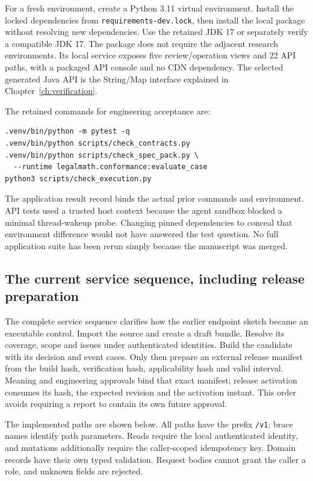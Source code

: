 \documentclass[12pt,a4paper,oneside,openany]{book}
\begin{document}
For a fresh environment, create a Python 3.11 virtual environment. Install the
locked dependencies from \texttt{requirements-dev.lock}, then install the local
package without resolving new dependencies. Use the retained JDK 17 or separately verify a compatible
JDK 17. The package does not require the adjacent research environments. Its
local service exposes five review/operation views and 22 API paths, with a
packaged API console and no CDN dependency. The selected generated Java API is
the String/Map interface explained in Chapter~\ref{ch:verification}.

The retained commands for engineering acceptance are:
\begin{lstlisting}
.venv/bin/python -m pytest -q
.venv/bin/python scripts/check_contracts.py
.venv/bin/python scripts/check_spec_pack.py \
  --runtime legalmath.conformance:evaluate_case
python3 scripts/check_execution.py
\end{lstlisting}
The application result record binds the actual prior commands and environment.
API tests used a trusted host context because the agent sandbox blocked a
minimal thread-wakeup probe. Changing pinned dependencies to conceal that
environment difference would not have answered the test question. No full
application suite has been rerun simply because the manuscript was merged.

\subsection{The current service sequence, including release preparation}

The complete service sequence clarifies how the earlier endpoint sketch became
an executable control. Import the source and create a draft bundle. Resolve
its coverage, scope and issues under authenticated identities. Build the
candidate with its decision and event cases. Only then prepare an external
release manifest from the build hash, verification hash, applicability hash
and valid interval. Meaning and engineering approvals bind that exact manifest;
release activation consumes its hash, the expected revision and the activation
instant. This order avoids requiring a report to contain its own future approval.

The implemented paths are shown below. All paths have the prefix
\texttt{/v1}; brace names identify path parameters. Reads require the local
authenticated identity, and mutations additionally require the caller-scoped
idempotency key. Domain records have their own typed validation. Request bodies
cannot grant the caller a role, and unknown fields are rejected.
\end{document}
